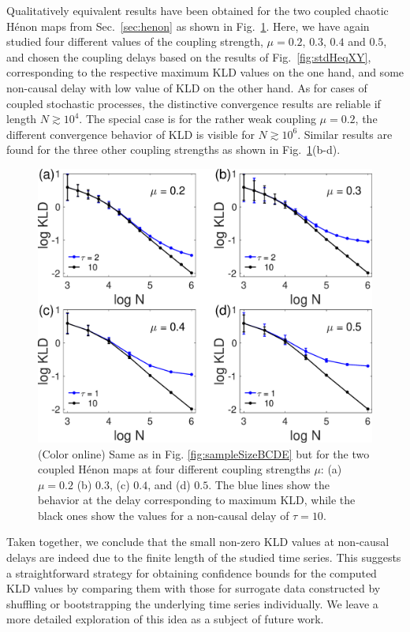 \documentclass[12pt,aip,cha,reprint,nofootinbib]{revtex4-1}
\begin{document}
Qualitatively equivalent results have been obtained for the two coupled chaotic H\'enon maps from Sec.~\ref{sec:henon} as shown in Fig.~\ref{fig:sampleSizeHenon}. Here, we have again studied four different values of the coupling strength, $\mu = 0.2$, $0.3$, $0.4$ and $0.5$, and chosen the coupling delays based on the results of Fig.~\ref{fig:stdHeqXY}, corresponding to the respective maximum KLD values on the one hand, and some non-causal delay with low value of KLD on the other hand. {\color{red}As for cases of coupled stochastic processes, the distinctive convergence results are reliable if length $N \gtrsim 10^4$. The special case is for} the rather weak coupling $\mu = 0.2$, the different convergence behavior of KLD is visible for $N \gtrsim 10^6$. Similar results are found for the three other coupling strengths as shown in Fig.~\ref{fig:sampleSizeHenon}(b-d). 
\begin{figure}
	\centering
	\includegraphics[width=\columnwidth]{kld_lengthHenon.eps}
\caption{(Color online) Same as in Fig. \ref{fig:sampleSizeBCDE} but for the two coupled H\'enon maps at four different coupling strengths $\mu$: (a) $\mu=0.2$ (b) $0.3$, (c) $0.4$, and (d) $0.5$. The blue lines show the behavior at the delay corresponding to maximum KLD, while the black ones show the values for a non-causal delay of $\tau=10$. \label{fig:sampleSizeHenon}}
\end{figure}

Taken together, we conclude that the small non-zero KLD values at non-causal delays are indeed due to the finite length of the studied time series. This suggests a straightforward strategy for obtaining confidence bounds for the computed KLD values by comparing them with those for surrogate data constructed by shuffling or bootstrapping the underlying time series individually. We leave a more detailed exploration of this idea as a subject of future work.
\end{document}
